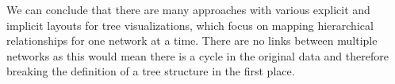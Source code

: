 We can conclude that there are many approaches with various explicit and implicit layouts for tree visualizations, which focus on mapping hierarchical relationships for one network at a time. There are no links between multiple networks as this would mean there is a cycle in the original data and therefore breaking the definition of a tree structure in the first place. 

